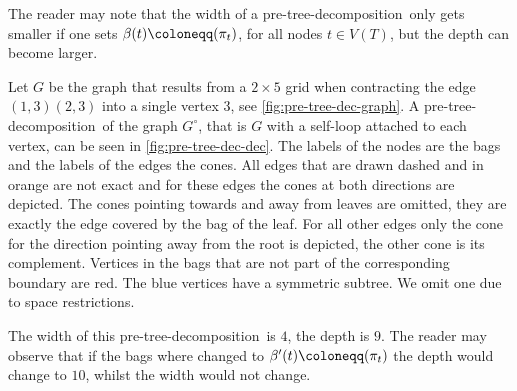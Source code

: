 \documentclass{lmcs}
\theoremstyle{plain}\newtheorem{claim}[thm]{Claim}   %
\let\boundary\relax
\newcommand{\boundary}{\Delta}
\newcommand{\preTreeDec}{pre-tree-decomposition}
\begin{document}
The reader may note that the width of a \preTreeDec\ only gets smaller if one sets $\beta(t)\coloneqq \boundary(\pi_t)$, for all nodes $t\in V(T)$, but the depth can become larger.

\begin{exa}
	\label{ex:pre-tree-dec}
	Let $G$ be the graph that results from a $2\times 5$ grid when contracting the edge $(1,3)(2,3)$ into a single vertex $3$, see \autoref{fig:pre-tree-dec-graph}.
	A \preTreeDec\ of the graph $G^\circ$, that is $G$ with a self-loop attached to each vertex, can be seen in \autoref{fig:pre-tree-dec-dec}.
	The labels of the nodes are the bags and the labels of the edges the cones.
	All edges that are drawn dashed and in orange are not exact and for these edges the cones at both directions are depicted.
	The cones pointing towards and away from leaves are omitted, they are exactly the edge covered by the bag of the leaf.
	For all other edges only the cone for the direction pointing away from the root is depicted, the other cone is its complement.
	Vertices in the bags that are not part of the corresponding boundary are red.
	The blue vertices have a symmetric subtree.
	We omit one due to space restrictions.
	
	The width of this \preTreeDec\ is $4$, the depth is $9$.
	The reader may observe that if the bags where changed to $\beta'(t)\coloneqq \boundary(\pi_t)$ the depth would change to $10$, whilst the width would not change.
\end{exa}
\end{document}
